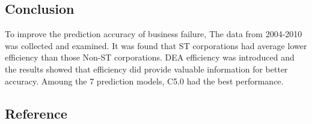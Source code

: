 \documentclass[]{article}
\begin{document}
\subsection{Conclusion}\label{conclusion}
To improve the prediction accuracy of business failure, The data from 2004-2010 was collected and examined. It was found that ST corporations had average lower efficiency than those Non-ST corporations. DEA efficiency was introduced and the results showed that efficiency did provide valuable information for better accuracy. Amoung the 7 prediction models, C5.0 had the best performance.



\subsection{Reference}\label{reference}


\end{document}
